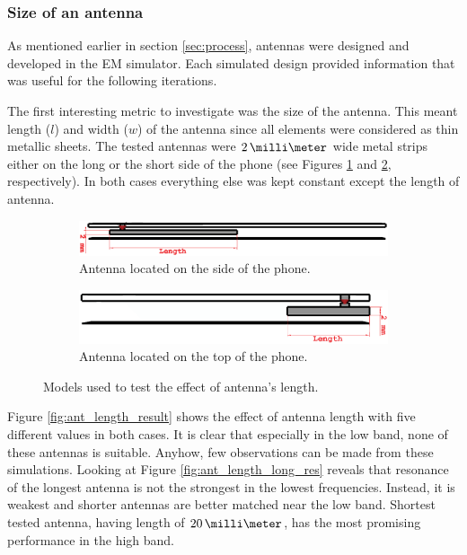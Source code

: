 \subsubsection{Size of an antenna}
\label{sec:antenna_size}
As mentioned earlier in section \ref{sec:process}, antennas were designed and developed in the EM simulator. Each simulated design provided information that was useful for the following iterations. 

The first interesting metric to investigate was the size of the antenna. This meant length ($l$) and width ($w$) of the antenna since all elements were considered as thin metallic sheets. The tested antennas were $2\,\milli\meter$ wide metal strips either on the long or the short side of the phone (see Figures \ref{fig:ant_length_long} and \ref{fig:ant_length_short}, respectively). In both cases everything else was kept constant except the length of antenna. 

\begin{figure}[H]
    \centering
    \begin{subfigure}[b]{0.49\textwidth}
        \includegraphics[width=\textwidth]{img/ant_length_long.eps}
        \caption{Antenna located on the side of the phone.}
        \label{fig:ant_length_long}
    \end{subfigure}
    \begin{subfigure}[b]{0.49\textwidth}
        \includegraphics[width=\textwidth]{img/ant_length_short.eps}
        \caption{Antenna located on the top of the phone.}
        \label{fig:ant_length_short}
    \end{subfigure}
    \caption{Models used to test the effect of antenna's length.}
    \label{fig:ant_length_model}
\end{figure}

Figure \ref{fig:ant_length_result} shows the effect of antenna length with five different values in both cases. It is clear that especially in the low band, none of these antennas is suitable. Anyhow, few observations can be made from these simulations. Looking at Figure \ref{fig:ant_length_long_res} reveals that resonance of the longest antenna is not the strongest in the lowest frequencies. Instead, it is weakest and shorter antennas are better matched near the low band. Shortest tested antenna, having length of $20\,\milli\meter$, has the most promising performance in the high band.

